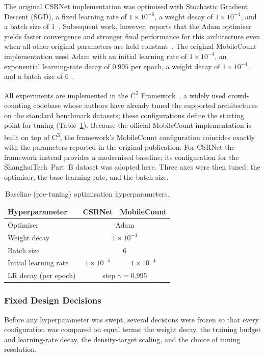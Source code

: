 \documentclass[conference]{IEEEtran}
\begin{document}
The original CSRNet implementation was optimised with Stochastic Gradient Descent
(SGD), a fixed learning rate of $1\times10^{-6}$, a weight decay of
$1\times10^{-4}$, and a batch size of $1$~\cite{li2018csrnet}. Subsequent work,
however, reports that the Adam optimiser yields faster convergence and stronger
final performance for this architecture even when all other original parameters
are held constant~\cite{jimaging7020021}. The original MobileCount implementation
used Adam with an initial learning rate of $1\times10^{-4}$, an exponential
learning-rate decay of $0.995$ per epoch, a weight decay of $1\times10^{-4}$, and
a batch size of $6$~\cite{wang2020mobilecount}.

All experiments are implemented in the C\textsuperscript{3}
Framework~\cite{gao2019c}, a widely used crowd-counting codebase whose authors
have already tuned the supported architectures on the standard benchmark
datasets; these configurations define the starting point for tuning
(Table~\ref{tab:baseline_hyperparameters}). Because the official MobileCount
implementation is built on top of C\textsuperscript{3}, the framework's
MobileCount configuration coincides exactly with the parameters reported in the
original publication. For CSRNet the framework instead provides a modernised
baseline; its configuration for the ShanghaiTech~Part~B dataset was adopted here.
Three axes were then tuned: the optimiser, the base learning rate, and the batch
size.

\begin{table}[t]
    \centering
    \caption{Baseline (pre-tuning) optimisation hyperparameters.}
    \label{tab:baseline_hyperparameters}
    \begin{tabular}{lcc}
        \toprule
        Hyperparameter & CSRNet & MobileCount \\
        \midrule
        Optimiser             & \multicolumn{2}{c}{Adam} \\
        Weight decay          & \multicolumn{2}{c}{$1\times10^{-4}$} \\
        Batch size            & \multicolumn{2}{c}{$6$} \\
        Initial learning rate & $1\times10^{-5}$ & $1\times10^{-4}$ \\
        LR decay (per epoch)  & \multicolumn{2}{c}{step $\gamma=0.995$} \\
        \bottomrule
    \end{tabular}
\end{table}


\subsubsection{Fixed Design Decisions}
Before any hyperparameter was swept, several decisions were frozen so that every configuration was compared on equal terms: the weight decay, the training budget and learning-rate decay, the density-target scaling, and the choice of tuning resolution. 
\end{document}
